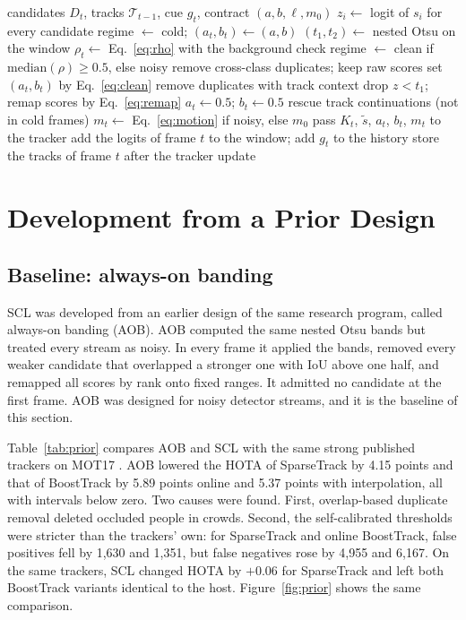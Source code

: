 \documentclass[pdflatex,sn-mathphys-num,iicol]{sn-jnl}
\newcommand{\scl}{SCL}
\newcommand{\aob}{AOB}
\begin{document}
\begin{algorithm}[t]
\caption{\scl{} for frame $t$}\label{alg:layer}
\begin{algorithmic}[1]
\Require candidates $D_t$, tracks $\mathcal{T}_{t-1}$, cue $g_t$, contract $(a,b,\ell,m_0)$
\State $z_i\gets$ logit of $s_i$ for every candidate
  \State regime $\gets$ cold; $(a_t,b_t)\gets(a,b)$
\Else
  \State $(t_1,t_2)\gets$ nested Otsu on the window
  \State $\rho_t\gets$ Eq.~\eqref{eq:rho} with the background check
  \State regime $\gets$ clean if $\mathrm{median}(\rho)\ge0.5$, else noisy
\EndIf
{}
  \State remove cross-class duplicates; keep raw scores
   set $(a_t,b_t)$ by Eq.~\eqref{eq:clean}
  \EndIf
\Else
  \State remove duplicates with track context
  \State drop $z<t_1$; remap scores by Eq.~\eqref{eq:remap}
  \State $a_t\gets0.5$; $b_t\gets0.5$
\EndIf
\State rescue track continuations (not in cold frames)
\State $m_t\gets$ Eq.~\eqref{eq:motion} if noisy, else $m_0$
\State pass $K_t$, $\tilde{s}$, $a_t$, $b_t$, $m_t$ to the tracker
\State add the logits of frame $t$ to the window; add $g_t$ to the history
\State store the tracks of frame $t$ after the tracker update
\end{algorithmic}
\end{algorithm}
\section{Development from a Prior Design}\label{sec:development}

\subsection{Baseline: always-on banding}\label{sec:prior}
\scl{} was developed from an earlier design of the same research program,
called always-on banding (\aob{}). \aob{} computed the same nested Otsu bands
but treated every stream as noisy. In every frame it applied the bands,
removed every weaker candidate that overlapped a stronger one with IoU above
one half, and remapped all scores by rank onto fixed ranges. It admitted no
candidate at the first frame. \aob{} was designed for noisy detector streams,
and it is the baseline of this section.

Table~\ref{tab:prior} compares \aob{} and \scl{} with the same strong published
trackers on MOT17 \cite{milan2016mot16}. \aob{} lowered the HOTA of
SparseTrack by 4.15 points and that of BoostTrack by 5.89 points online and
5.37 points with interpolation, all with intervals below zero. Two causes were
found. First, overlap-based duplicate removal deleted occluded people in
crowds. Second, the self-calibrated thresholds were stricter than the
trackers' own: for SparseTrack and online BoostTrack, false positives fell by
1,630 and 1,351, but false negatives rose by 4,955 and 6,167. On the same
trackers, \scl{} changed HOTA by $+0.06$ for SparseTrack and left both
BoostTrack variants identical to the host. Figure~\ref{fig:prior} shows the
same comparison.
\end{document}
